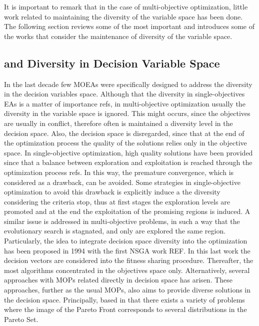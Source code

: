 It is important to remark that in the case of multi-objective optimization, little work related to maintaining the 
diversity of the variable space has been done.
%
The following section reviews some of the most important \MOEAS{} and introduces some of the works that consider
the maintenance of diversity of the variable space.


\subsection{\MOEAS{} and Diversity in Decision Variable Space}\label{MOEAs:Diversity}

In the last decade few MOEAs were specifically designed to address the diversity in the decision variables space.
%
Although that the diversity in single-objectives EAs is a matter of importance refs, in multi-objective optimization usually the diversity in the variable space is ignored.
%
This might occurs, since the objectives are usually in conflict, therefore often is maintained a diversity level in the decision space.
%
Also, the decision space is disregarded, since that at the end of the optimization process the quality of the solutions relies only in the objective space.
%
In single-objective optimization, high quality solutions have been provided since that a balance between exploration and exploitation is reached through the optimization process refs.
%
In this way, the premature convergence, which is considered as a drawback, can be avoided.
%
Some strategies in single-objective optimization to avoid this drawback is explicitly induce a the diversity considering the criteria stop, thus at first stages the exploration levels are promoted and at the end the exploitation of the promising regions is induced.
%
A similar issue is addressed in multi-objective problems, in such a way that the evolutionary search is stagnated, and only are explored the same region.
%
Particularly, the idea to integrate decision space diversity into the optimization has been proposed in 1994 with the first NSGA work REF.
%
In this last work the decision vectors are considered into the fitness sharing procedure.
%
Thereafter, the most algorithms concentrated in the objectives space only.
%
Alternatively, several approaches with MOPs related directly in decision space has arisen.
%
These approaches, further as the usual MOPs, also aims to provide diverse solutions in the decision space.
%
Principally, based in that there exists a variety of problems where the image of the Pareto Front corresponds to several distributions in the Pareto Set.
%


